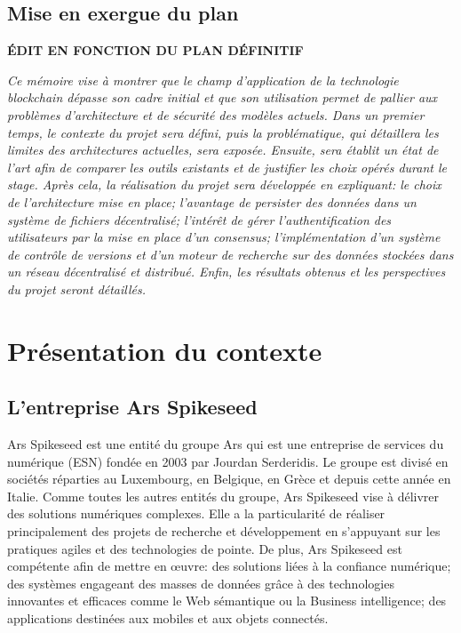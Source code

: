 \documentclass{tnreport}
\begin{document}
\section{Mise en exergue du plan}

\textbf{ÉDIT EN FONCTION DU PLAN DÉFINITIF}

\textit{
Ce mémoire vise à montrer que le champ d'application de la technologie blockchain dépasse son cadre initial et que son utilisation permet de pallier aux problèmes d'architecture et de sécurité des modèles actuels. 
Dans un premier temps, le contexte du projet sera défini, puis la problématique, qui détaillera les limites des architectures actuelles, sera exposée. 
Ensuite, sera établit un état de l'art afin de comparer les outils existants et de justifier les choix opérés durant le stage. 
Après cela, la réalisation du projet sera développée en expliquant: 
le choix de l'architecture mise en place; 
l'avantage de persister des données dans un système de fichiers décentralisé; 
l'intérêt de gérer l'authentification des utilisateurs par la mise en place d'un consensus; 
l'implémentation d'un système de contrôle de versions et d'un moteur de recherche sur des données stockées dans un réseau décentralisé et distribué. 
Enfin, les résultats obtenus et les perspectives du projet seront détaillés.
}

\chapter{Présentation du contexte}

\section{L'entreprise Ar{\texteta}s Spikeseed}

Ar{\texteta}s Spikeseed est une entité du groupe Ar{\texteta}s qui est une entreprise de services du numérique (ESN) fondée en 2003 par Jourdan Serderidis. 
Le groupe est divisé en sociétés réparties au Luxembourg, en Belgique, en Grèce et depuis cette année en Italie. 
Comme toutes les autres entités du groupe, Ar{\texteta}s Spikeseed vise à délivrer des solutions numériques complexes. Elle a la particularité de réaliser principalement des projets de recherche et développement en s'appuyant sur les pratiques agiles et des technologies de pointe. 
De plus, Ar{\texteta}s Spikeseed est compétente afin de mettre en œuvre: 
des solutions liées à la confiance numérique; 
des systèmes engageant des masses de données grâce à des technologies innovantes et efficaces comme le Web sémantique ou la Business intelligence; 
des applications destinées aux mobiles et aux objets connectés.
\end{document}

